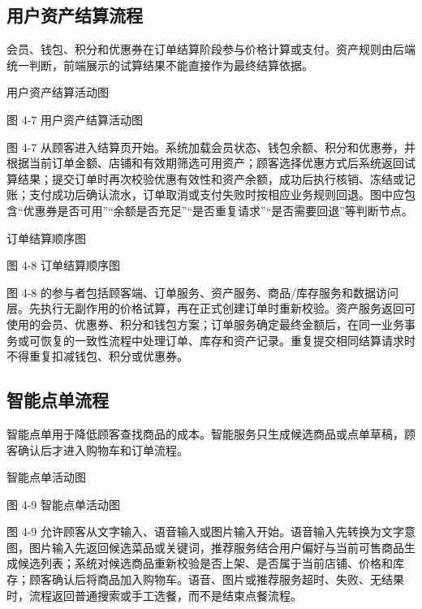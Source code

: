 \subsection{用户资产结算流程}

会员、钱包、积分和优惠券在订单结算阶段参与价格计算或支付。资产规则由后端统一判断，前端展示的试算结果不能直接作为最终结算依据。

用户资产结算活动图

\begin{center}
\end{center}

图 4-7  用户资产结算活动图

图 4-7 从顾客进入结算页开始。系统加载会员状态、钱包余额、积分和优惠券，并根据当前订单金额、店铺和有效期筛选可用资产；顾客选择优惠方式后系统返回试算结果；提交订单时再次校验优惠有效性和资产余额，成功后执行核销、冻结或记账；支付成功后确认流水，订单取消或支付失败时按相应业务规则回退。图中应包含“优惠券是否可用”“余额是否充足”“是否重复请求”“是否需要回退”等判断节点。

订单结算顺序图

\begin{center}
\end{center}

图 4-8  订单结算顺序图

图 4-8 的参与者包括顾客端、订单服务、资产服务、商品/库存服务和数据访问层。先执行无副作用的价格试算，再在正式创建订单时重新校验。资产服务返回可使用的会员、优惠券、积分和钱包方案；订单服务确定最终金额后，在同一业务事务或可恢复的一致性流程中处理订单、库存和资产记录。重复提交相同结算请求时不得重复扣减钱包、积分或优惠券。

\subsection{智能点单流程}

智能点单用于降低顾客查找商品的成本。智能服务只生成候选商品或点单草稿，顾客确认后才进入购物车和订单流程。

智能点单活动图

\begin{center}
\end{center}

图 4-9  智能点单活动图

图 4-9 允许顾客从文字输入、语音输入或图片输入开始。语音输入先转换为文字意图，图片输入先返回候选菜品或关键词，推荐服务结合用户偏好与当前可售商品生成候选列表；系统对候选商品重新校验是否上架、是否属于当前店铺、价格和库存；顾客确认后将商品加入购物车。语音、图片或推荐服务超时、失败、无结果时，流程返回普通搜索或手工选餐，而不是结束点餐流程。


